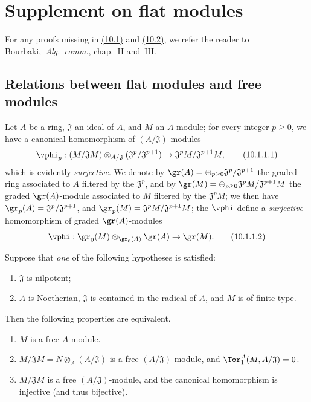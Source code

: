 \section{Supplement on flat modules}
\label{section:0.10}

For any proofs missing in \hyperref[subsection:0.10.1]{(10.1)} and \hyperref[subsection:0.10.2]{(10.2)}, we refer the reader to Bourbaki,~\emph{Alg.~comm.}, chap.~II and~III.

\subsection{Relations between flat modules and free modules}
\label{subsection:0.10.1}

\begin{env}[10.1.1]
\label{0.10.1.1}
Let $A$ be a ring, $\mathfrak{J}$ an ideal of $A$, and $M$ an $A$-module;
for every integer $p\geq0$, we have a canonical homomorphism of $(A/\mathfrak{J})$-modules
\[
\label{0.10.1.1.1}
  \vphi_p:(M/\mathfrak{J}M)\otimes_{A/\mathfrak{J}}(\mathfrak{J}^p/\mathfrak{J}^{p+1})\to\mathfrak{J}^pM/\mathfrak{J}^{p+1}M,
  \tag{10.1.1.1}
\]
which is evidently \emph{surjective}.
We denote by $\gr(A)=\oplus_{p\geq0}\mathfrak{J}^p/\mathfrak{J}^{p+1}$ the graded ring associated to $A$ filtered by the $\mathfrak{J}^p$, and by $\gr(M)=\oplus_{p\geq0}\mathfrak{J}^pM/\mathfrak{J}^{p+1}M$ the graded $\gr(A)$-module associated to $M$ filtered by the $\mathfrak{J}^pM$;
we then have $\gr_p(A)=\mathfrak{J}^p/\mathfrak{J}^{p+1}$, and $\gr_p(M)=\mathfrak{J}^pM/\mathfrak{J}^{p+1}M$;
the $\vphi$ define a \emph{surjective} homomorphism of graded $\gr(A)$-modules
\[
\label{0.10.1.1.2}
  \vphi:\gr_0(M)\otimes_{\gr_0(A)}\gr(A)\to\gr(M).
  \tag{10.1.1.2}
\]
\end{env}

\begin{env}[10.1.2]
\label{0.10.1.2}
Suppose that \emph{one} of the following hypotheses is satisfied:
\begin{enumerate}
  \item[(i)] $\mathfrak{J}$ is nilpotent;
  \item[(ii)] $A$ is Noetherian, $\mathfrak{J}$ is contained in the radical of $A$, and $M$ is of finite type.
\end{enumerate}
Then the following properties are equivalent.
\begin{enumerate}
  \item[(a)] $M$ is a free $A$-module.
  \item[(b)] $M/\mathfrak{J}M=N\otimes_A(A/\mathfrak{J})$ is a free $(A/\mathfrak{J})$-module, and $\Tor_1^A(M,A/\mathfrak{J})=0$.
  \item[(c)] $M/\mathfrak{J}M$ is a free $(A/\mathfrak{J})$-module, and the canonical homomorphism  is injective (and thus bijective).
\end{enumerate}
\end{env}

